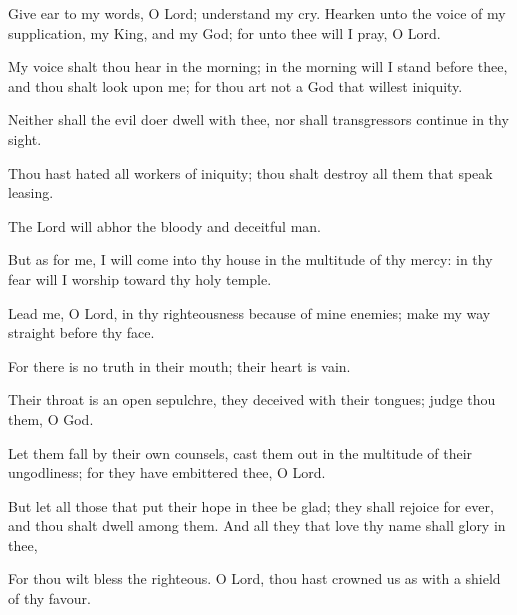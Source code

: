 Give ear to my words, O Lord; understand my cry. Hearken unto the voice of my supplication, my King, and my God; for unto thee will I pray, O Lord.

My voice shalt thou hear in the morning; in the morning will I stand before thee, and thou shalt look upon me; for thou art not a God that willest iniquity.

Neither shall the evil doer dwell with thee, nor shall transgressors continue in thy sight.

Thou hast hated all workers of iniquity; thou shalt destroy all them that speak leasing.

The Lord will abhor the bloody and deceitful man.

But as for me, I will come into thy house in the multitude of thy mercy: in thy fear will I worship toward thy holy temple.

Lead me, O Lord, in thy righteousness because of mine enemies; make my way straight before thy face.

For there is no truth in their mouth; their heart is vain.

Their throat is an open sepulchre, they deceived with their tongues; judge thou them, O God.

Let them fall by their own counsels, cast them out in the multitude of their ungodliness; for they have embittered thee, O Lord.

But let all those that put their hope in thee be glad; they shall rejoice for ever, and thou shalt dwell among them. And all they that love thy name shall glory in thee,

For thou wilt bless the righteous. O Lord, thou hast crowned us as with a shield of thy favour.
